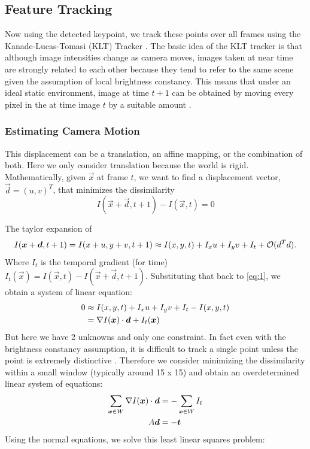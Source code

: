 \subsection{Feature Tracking}
\label{sec:feature-tracking}
Now using the detected keypoint, we track these points over all frames
using the Kanade-Lucas-Tomasi (KLT) Tracker \cite{KLT}.
The basic idea of the KLT tracker is that although image intensities change as
camera moves, images taken at near time are strongly related to each
other because they tend to refer to the same scene given the
assumption of local brightness constancy. This means that under an ideal
static environment, image at time $t+1$ can be obtained by moving
every pixel in the at time image $t$ by a suitable amount \cite{shi}. 

\subsubsection{Estimating Camera Motion}
This displacement can be a translation, an affine mapping, or
the combination of both. Here we only consider translation because the world is rigid. Mathematically, given $\vec x$ at frame $t$, we
want to find a displacement vector, $\vec d=(u,v)^T$, that minimizes
the dissimilarity
\begin{equation}
  \label{eq:1}
 I(\vec x + \vec d, t+1) - I(\vec x, t) = 0
\end{equation}

The taylor expansion of $$I(\boldsymbol{x}+\boldsymbol{d}, t+1) = I(x+u, y+v, t+1) \approx I(x,y,t) + I_xu +
I_yv +  I_t +  \mathcal{O}(d^Td).$$  Where $I_t$ is the temporal
gradient (for time) $I_t(\vec x) =I(\vec x, t) - I(\vec x+\vec d,
t+1)$. Substituting that back to \eqref{eq:1}, we obtain a system of
linear equation:
\begin{align*}
0 &\approx I(x,y,t) + I_xu +I_yv  + I_t - I(x,y,t)\\
&= \nabla I(\boldsymbol{x})\cdot \boldsymbol{d} + I_t(\boldsymbol{x})
\end{align*}
But here we have 2 unknowns and only one constraint. In fact even with the brightness
constancy assumption, it is difficult to track a single point unless
the point is extremely distinctive \cite{KLT}. Therefore we consider minimizing
the dissimilarity within a small window (typically around 15 x 15) and
obtain an overdetermined linear system of equations:
\begin{align*}
\sum_{\boldsymbol{x}\in W} \nabla I(\boldsymbol{x}) \cdot \boldsymbol{d} &= - \sum_{\boldsymbol{x}\in W}
I_t \\
A\boldsymbol{d} &= -\boldsymbol{t}
\end{align*}
Using the normal equations, we solve this least linear squares
problem:


